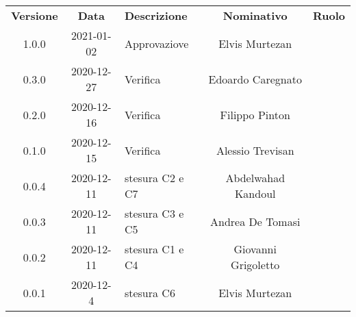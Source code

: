 {
    \renewcommand{\arraystretch}{1.5}
    \centering
    \begin{longtable}{ c c  C{4cm}  c  c }
        \rowcolor{\primaryColor}
        \textcolor{\secondaryColor}{
        \textbf{Versione}}     & \textcolor{\secondaryColor}{\textbf{Data}}       & \textcolor{\secondaryColor}
        {\textbf{Descrizione}} & \textcolor{\secondaryColor}{\textbf{Nominativo}} & \textcolor{\secondaryColor}{\textbf{Ruolo}}                          \\


        1.0.0   &2021-01-02 &Approvaziove &Elvis Murtezan &\responsabile{}\\
        0.3.0                  &2020-12-27                                      & Verifica                          &Edoardo Caregnato &\verificatore{}\\
        0.2.0                  &2020-12-16                                      & Verifica                          &Filippo Pinton &\verificatore{}\\
        0.1.0                  &2020-12-15                                      & Verifica                          &Alessio Trevisan &\verificatore{}\\
		0.0.4                  & 2020-12-11                                       & stesura C2 e C7                     & Abdelwahad Kandoul & \redattore{}    \\
        0.0.3                  & 2020-12-11                                       & stesura C3 e C5    					& Andrea De Tomasi & \redattore{}    \\
        0.0.2                  & 2020-12-11                                       & stesura C1 e C4   					& Giovanni Grigoletto& \redattore{} \\        
        0.0.1                  & 2020-12-4                                       & stesura C6 & Elvis Murtezan & \redattore{} \\
    \end{longtable}
}
